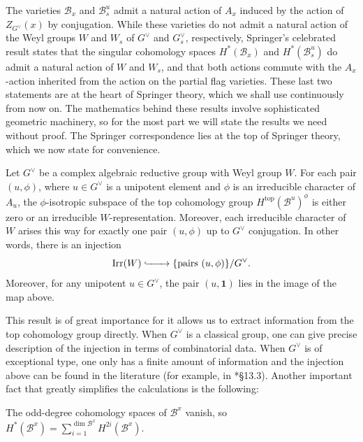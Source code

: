The varieties $\mathcal{B}_x$ and $\mathcal{B}_s^u$ admit a natural action of $A_x$ induced by the action of $Z_{G^\vee}(x)$ by conjugation. While these varieties do not admit a natural action of the Weyl groups $W$ and $W_s$ of $G^\vee$ and $G^\vee_s$, respectively, Springer's celebrated result states that the singular cohomology spaces $H^*(\mathcal{B}_x)$ and $H^*(\mathcal{B}_s^u)$ do admit a natural action of $W$ and $W_s$, and that both actions commute with the $A_x$-action inherited from the action on the partial flag varieties. These last two statements are at the heart of Springer theory, which we shall use continuously from now on. The mathematics behind these results involve sophisticated geometric machinery, so for the most part we will state the results we need without proof. The Springer correspondence lies at the top of Springer theory, which we now state for convenience. 

\begin{theorem}
    Let $G^\vee$ be a complex algebraic reductive group with Weyl group $W$. For each pair $(u,\phi)$, where $u\in G^\vee$ is a unipotent element and $\phi$ is an irreducible character of $A_u$, the $\phi$-isotropic subspace of the top cohomology group $H^{\mathrm{top}}(\mathcal{B}^u)^\phi$ is either zero or an irreducible $W$-representation. Moreover, each irreducible character of $W$ arises this way for exactly one pair $(u,\phi)$ up to $G^\vee$ conjugation. In other words, there is an injection
    $$\mathrm{Irr}(W)\xhookrightarrow{\quad\quad}\{\textrm{pairs }(u,\phi)\}/G^\vee.$$
    Moreover, for any unipotent $u\in G^\vee$, the pair $(u,\mathbf{1})$ lies in the image of the map above.
\end{theorem}
This result is of great importance for it allows us to extract information from the top cohomology group directly. When $G^\vee$ is a classical group, one can give precise description of the injection in terms of combinatorial data. When $G^\vee$ is of exceptional type, one only has a finite amount of information and the injection above can be found in the literature (for example, in \cite{Carter1985}*{\S 13.3}). Another important fact that greatly simplifies the calculations is the following:

\begin{theorem}\label{thm:odd_vanish}
    The odd-degree cohomology spaces of $\mathcal{B}^x$ vanish, so $H^*(\mathcal{B}^x)=\sum_{i=1}^{\dim\mathcal{B}^x}H^{2i}(\mathcal{B}^x)$.
\end{theorem}

